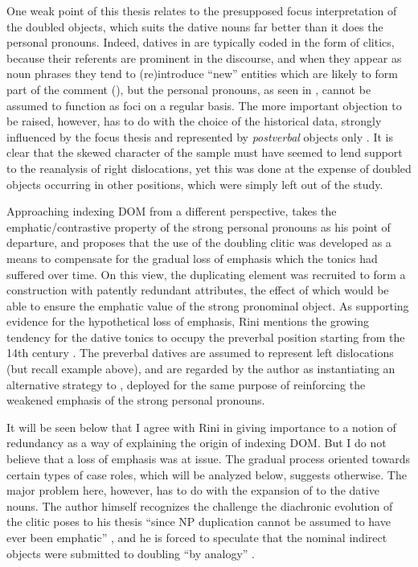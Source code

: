 \documentclass[output=paper]{LSP/langsci}
\begin{document}
 One weak point of this thesis relates to the presupposed focus interpretation of the doubled objects, which suits the dative nouns far better than it does the personal pronouns. Indeed, datives in  are typically coded in the form of clitics, because their referents are prominent in the discourse, and when they appear as noun phrases they tend to (re)introduce “new” entities which are likely to form part of the comment (\citealt[286–287]{Rozasetal2012Object}), but the personal pronouns, as seen in , cannot be assumed to function as foci on a regular basis. The more important objection to be raised, however, has to do with the choice of the historical data, strongly influenced by the focus thesis and represented by \textit{postverbal} objects only \citep[75]{Gabrieletal2010Information}. It is clear that the skewed character of the sample must have seemed to lend support to the reanalysis of right dislocations, yet this was done at the expense of doubled objects occurring in other positions, which were simply left out of the study. 

 Approaching  indexing DOM from a different perspective, \citet{Rini1991Redundant} takes the emphatic/contrastive property of the strong personal pronouns as his point of departure, and proposes that the use of the doubling clitic was developed as a means to compensate for the gradual loss of emphasis which the tonics had suffered over time. On this view, the duplicating element was recruited to form a construction with patently redundant attributes, the effect of which would be able to ensure the emphatic value of the strong pronominal object. As supporting evidence for the hypothetical loss of emphasis, Rini mentions the growing tendency for the dative tonics to occupy the preverbal position starting from the 14th century \citep[277]{Rini1991Redundant}. The preverbal datives are assumed to represent left dislocations (but recall example  above), and are regarded by the author as instantiating an alternative strategy to , deployed for the same purpose of reinforcing the weakened emphasis of the strong personal pronouns.

 It will be seen below that I agree with Rini in giving importance to a notion of redundancy as a way of explaining the origin of  indexing DOM. But I do not believe that a loss of emphasis was at issue. The gradual process oriented towards certain types of case roles, which will be analyzed below, suggests otherwise. The major problem here, however, has to do with the expansion of  to the dative nouns. The author himself recognizes the challenge the diachronic evolution of the clitic poses to his thesis “since NP duplication cannot be assumed to have ever been emphatic” \citep[282]{Rini1991Redundant}, and he is forced to speculate that the nominal indirect objects were submitted to doubling “by analogy” \citep[282]{Rini1991Redundant}.
\end{document}
